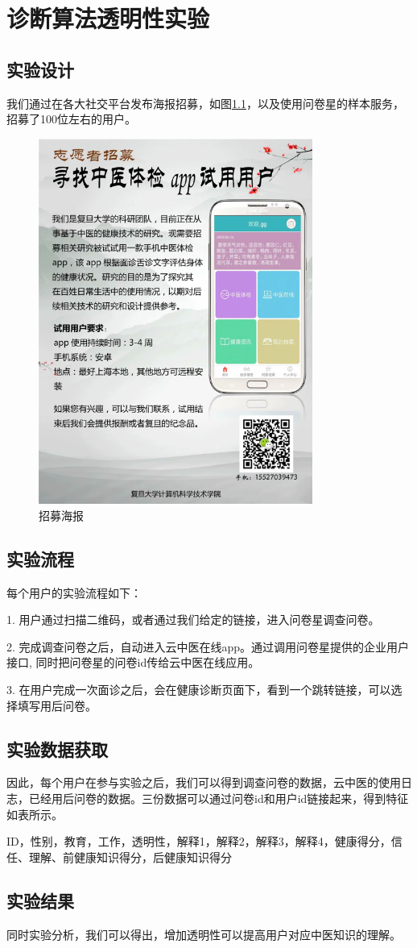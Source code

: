 \chapter{诊断算法透明性实验}

\section{实验设计}
我们通过在各大社交平台发布海报招募，如图\ref{fig:poster}，以及使用问卷星的样本服务，招募了100位左右的用户。
\begin{figure}[htb]
    \centering
    \includegraphics[height=12cm]{images/poster.png}
    \caption{招募海报}
    \label{fig:poster}
\end{figure}
\section{实验流程}
每个用户的实验流程如下：

1. 用户通过扫描二维码，或者通过我们给定的链接，进入问卷星调查问卷。

2. 完成调查问卷之后，自动进入云中医在线app。通过调用问卷星提供的企业用户接口, 同时把问卷星的问卷id传给云中医在线应用。

3. 在用户完成一次面诊之后，会在健康诊断页面下，看到一个跳转链接，可以选择填写用后问卷。



\section{实验数据获取}
因此，每个用户在参与实验之后，我们可以得到调查问卷的数据，云中医的使用日志，已经用后问卷的数据。三份数据可以通过问卷id和用户id链接起来，得到特征如表所示。

ID，性别，教育，工作，透明性，解释1，解释2，解释3，解释4，健康得分，信任、理解、前健康知识得分，后健康知识得分

\section{实验结果}
同时实验分析，我们可以得出，增加透明性可以提高用户对应中医知识的理解。



